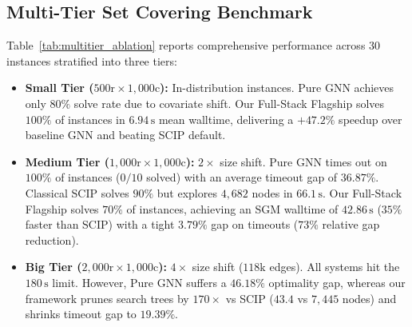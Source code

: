 \documentclass[10pt,twocolumn,letterpaper]{article}
\theoremstyle{plain}
\theoremstyle{definition}
\theoremstyle{remark}
\begin{document}
\subsection{Multi-Tier Set Covering Benchmark}
Table~\ref{tab:multitier_ablation} reports comprehensive performance across 30 instances stratified into three tiers:
\begin{itemize}
    \item \textbf{Small Tier ($500\text{r} \times 1,000\text{c}$):} In-distribution instances. Pure GNN achieves only $80\%$ solve rate due to covariate shift. Our Full-Stack Flagship solves $100\%$ of instances in $6.94\,\text{s}$ mean walltime, delivering a $+47.2\%$ speedup over baseline GNN and beating SCIP default.
    \item \textbf{Medium Tier ($1,000\text{r} \times 1,000\text{c}$):} $2\times$ size shift. Pure GNN times out on $100\%$ of instances ($0/10$ solved) with an average timeout gap of $36.87\%$. Classical SCIP solves $90\%$ but explores $4,682$ nodes in $66.1\,\text{s}$. Our Full-Stack Flagship solves $70\%$ of instances, achieving an SGM walltime of $42.86\,\text{s}$ ($35\%$ faster than SCIP) with a tight $3.79\%$ gap on timeouts ($73\%$ relative gap reduction).
    \item \textbf{Big Tier ($2,000\text{r} \times 1,000\text{c}$):} $4\times$ size shift ($118\text{k}$ edges). All systems hit the $180\,\text{s}$ limit. However, Pure GNN suffers a $46.18\%$ optimality gap, whereas our framework prunes search trees by $170\times$ vs SCIP ($43.4$ vs $7,445$ nodes) and shrinks timeout gap to $19.39\%$.
\end{itemize}
\end{document}
